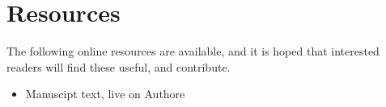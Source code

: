 \section{Resources}

The following online resources are available, and it is hoped that interested readers will find these useful, and contribute.

\begin{itemize}
\item Manuscipt text, live on Authore
\end{itemize}